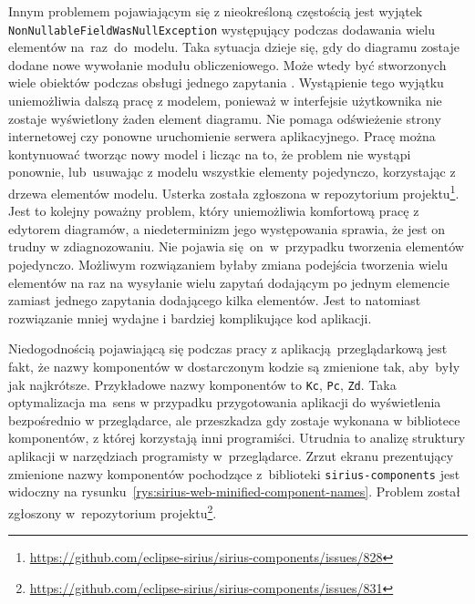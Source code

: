 Innym problemem pojawiającym się z nieokreśloną częstością jest wyjątek
\texttt{NonNullable\-FieldWasNullException} występujący podczas
dodawania wielu
elementów na~raz~do~modelu. Taka sytuacja dzieje się, gdy do diagramu zostaje
dodane nowe wywołanie modułu obliczeniowego. Może wtedy być stworzonych wiele
obiektów podczas obsługi jednego zapytania \GraphQL{}. Wystąpienie tego
wyjątku uniemożliwia dalszą pracę z modelem, ponieważ w interfejsie użytkownika
nie zostaje wyświetlony żaden element diagramu. Nie pomaga odświeżenie strony
internetowej czy ponowne uruchomienie serwera aplikacyjnego. Pracę można
kontynuować tworząc nowy model i licząc na to, że problem nie wystąpi ponownie,
lub~usuwając z modelu wszystkie elementy pojedynczo, korzystając z drzewa
elementów modelu. Usterka została zgłoszona w repozytorium
projektu\footnote{
	\url{https://github.com/eclipse-sirius/sirius-components/issues/828}
}. Jest to kolejny poważny problem, który uniemożliwia komfortową pracę z
edytorem diagramów, a niedeterminizm jego występowania sprawia, że jest on
trudny w zdiagnozowaniu. Nie pojawia się~on~w~przypadku tworzenia elementów
pojedynczo. Możliwym rozwiązaniem byłaby zmiana podejścia tworzenia wielu
elementów na raz na wysyłanie wielu zapytań \GraphQL{} dodającym po jednym
elemencie zamiast jednego zapytania dodającego kilka elementów. Jest to
natomiast rozwiązanie mniej wydajne i bardziej komplikujące kod aplikacji.

Niedogodnością pojawiającą się podczas pracy z aplikacją przeglądarkową
\SiriusWeb{} jest fakt, że nazwy komponentów w dostarczonym kodzie
\JavaScript{} są zmienione tak, aby~były jak najkrótsze. Przykładowe nazwy
komponentów to \texttt{Kc}, \texttt{Pc}, \texttt{Zd}. Taka optymalizacja
ma~sens w przypadku przygotowania aplikacji do wyświetlenia bezpośrednio w
przeglądarce, ale przeszkadza gdy zostaje wykonana w bibliotece komponentów, z
której korzystają inni programiści. Utrudnia to analizę
struktury aplikacji w
narzędziach programisty w~przeglądarce. Zrzut ekranu prezentujący zmienione
nazwy komponentów pochodzące z~biblioteki \texttt{sirius-components} jest
widoczny na rysunku~\ref{rys:sirius-web-minified-component-names}. Problem
został zgłoszony w~repozytorium
projektu\footnote{
	\url{https://github.com/eclipse-sirius/sirius-components/issues/831}
}.

